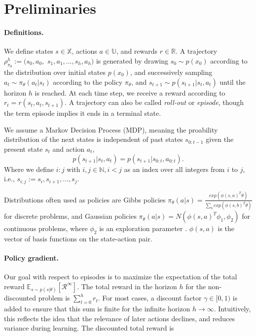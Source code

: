 \section{Preliminaries}
\label{sec:prel}

\paragraph{Definitions.} We define states $s \in \mathbb{X}$, actions $a \in \mathbb{U}$, and rewards $r \in \mathbb{R}$. A trajectory $\rho_{\pi_\theta}^h := (s_0, a_0, $ $s_1, a_1, \dots, s_h, a_h)$ is generated by drawing $s_0 \sim p(x_0)$ according to the distribution over initial states $p(x_0)$, and successively sampling $a_t \sim \pi_\theta(a_t|s_t)$ according to the policy $\pi_\theta$, and $s_{t+1} \sim p(s_{t+1}|s_t,a_t)$ until the horizon $h$ is reached. At each time step, we receive a reward according to $r_t = r(s_t, a_t, s_{t+1})$. A trajectory can also be called \textit{roll-out} or \textit{episode}, though the term episode implies it ends in a terminal state.

We assume a Markov Decision Process (MDP), meaning the proability distribution of the next states is independent of past states $s_{0:t-1}$ given the present state $s_t$ and action $a_t$, 
\begin{equation}
	p(s_{t+1}|s_t,a_t)=p(s_{t+1}|s_{0:t},a_{0:t}).
\end{equation}
Where we define $i:j$ with $i,j \in \mathbb{N}, i < j$ as an index over all integers from $i$ to $j$, i.e., $s_{i:j} := s_i, s_{i+1}, \dots, s_j$. 

Distributions often used as policies are Gibbs policies $\pi_\theta(a|s) = \frac{exp(\phi(s,a)^T\theta)}{\sum_b exp(\phi(s,b)^T\theta)}$ \cite{Sutton:1999:PGM:3009657.3009806,Bagnell2004LearningD} for discrete problems, and Gaussian policies $\pi_\theta(a|s) = N(\phi(s,a)^T\phi_1,\phi_2)$ for continuous problems, where $\phi_2$ is an exploration parameter \cite{Williams92simplestatistical,peter:article:1996}. $\phi(s,a)$ is the vector of basis functions on the state-action pair.

\paragraph{Policy gradient.} Our goal with respect to episodes is to maximize the expectation of the total reward $\mathbb{E}_{s\sim p(s|\theta)}\left[\mathcal{R}^\infty\right]$. The total reward in the horizon $h$ for the non-discounted problem is $\sum_{t=0}^{h} r_{t}$. For most cases, a discount factor $\gamma \in [0,1)$ is added to ensure that this sum is finite for the infinite horizon $h\to\infty$. Intuitively, this reflects the idea that the relevance of later actions declines, and reduces variance during learning. The discounted total reward is 

